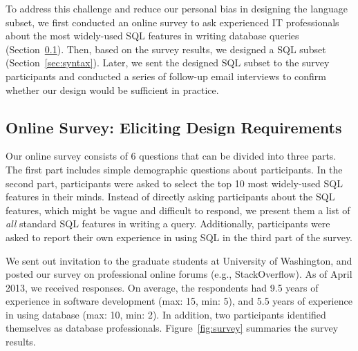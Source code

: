 To address this challenge and reduce our personal bias
in designing the language subset, we first conducted an online survey
to ask experienced IT professionals about the most widely-used
SQL features in writing database queries (Section~\ref{sec:survey}).
Then, based on the survey results, we designed
a SQL subset (Section~\ref{sec:syntax}).  
Later, we sent the designed SQL subset to the survey participants
and conducted a series of follow-up email interviews
to confirm whether our design would be sufficient in practice.









\subsection{Online Survey: Eliciting Design Requirements}
\label{sec:survey}


Our online survey consists of 6 questions that can be
divided into three parts. The first part includes
simple demographic questions about participants.
In the second part, participants were asked to select
the top 10 most widely-used SQL features in their minds.
Instead of directly asking participants about the SQL
features, which might be vague and difficult to respond,
we present them a list of \textit{all} standard
SQL features in writing a query.
Additionally, participants were asked to report their 
own experience in using SQL in the third part of the survey.



We sent out invitation to the graduate students at
University of Washington, and posted our survey on
professional online forums (e.g., StackOverflow).
As of April 2013, we received \respnum responses.
On average, the respondents had 9.5 years of experience
in software development (max: 15, min: 5),
and 5.5 years of experience in
using database (max: 10, min: 2). In addition, two
participants identified themselves as database professionals.
Figure~\ref{fig:survey} summaries the survey results.

